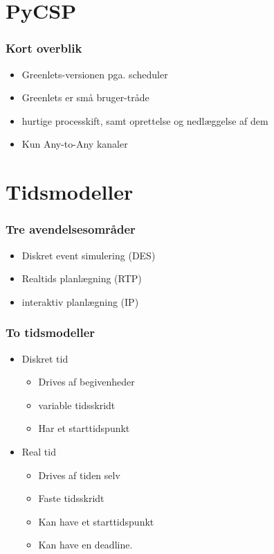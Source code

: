 \documentclass[12pt]{beamer}
\begin{document}
\section{PyCSP}
\begin{frame}		
  \frametitle{Kort overblik}
  \begin{itemize}
	\item Greenlets-versionen pga. scheduler
	\item Greenlets er små bruger-tråde
	\item hurtige processkift, samt oprettelse og nedlæggelse af dem
	\item Kun Any-to-Any kanaler
  \end{itemize}
\end{frame}

\section{Tidsmodeller}
\begin{frame}
	\frametitle{Tre avendelsesområder}
	\begin{itemize}
		\item Diskret event simulering (DES)
		\item Realtids planlægning (RTP)
		\item interaktiv planlægning (IP)
	\end{itemize}
\end{frame}

\begin{frame}
	\frametitle{To tidsmodeller}
	\begin{itemize}
		\item Diskret tid
		\begin{itemize}
			\item Drives af begivenheder
			\item variable tidsskridt
			\item Har et starttidspunkt
 		\end{itemize}
		\item Real tid
		\begin{itemize}
			\item Drives af tiden selv
			\item Faste tidsskridt
			\item Kan have et starttidspunkt
			\item Kan have en deadline.
		\end{itemize}
	\end{itemize}
\end{frame}
\end{document}
